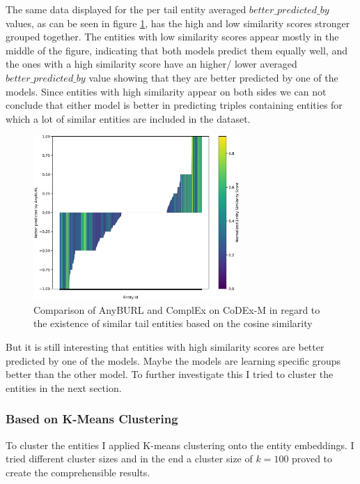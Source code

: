 The same data displayed for the per tail entity averaged $better\_predicted\_by$ values, as can be seen in figure \ref{fig:tail_similarity_anyburl_complex_codex}, has the high and low similarity scores stronger grouped together. The entities with low similarity scores appear mostly in the middle of the figure, indicating that both models predict them equally well, and the ones with a high similarity score have an higher/ lower averaged $better\_predicted\_by$ value showing that they are better predicted by one of the models. Since entities with high similarity appear on both sides we can not conclude that either model is better in predicting triples containing entities for which a lot of similar entities are included in the dataset. 

\begin{figure}[H]
\centering
\includegraphics[width=0.7\textwidth]{images/tail_similarity_anyburl_complex_codex.PNG}
\caption{Comparison of AnyBURL and ComplEx on CoDEx-M in regard to the existence of similar tail entities based on the cosine similarity}
\label{fig:tail_similarity_anyburl_complex_codex}
\end{figure}

But it is still interesting that entities with high similarity scores are better predicted by one of the models. Maybe the models are learning specific groups better than the other model. To further investigate this I tried to cluster the entities in the next section.

\subsubsection{Based on K-Means Clustering}
To cluster the entities I applied K-means clustering onto the entity embeddings. I tried different cluster sizes and in the end a cluster size of $k=100$ proved to create the comprehensible results. 


